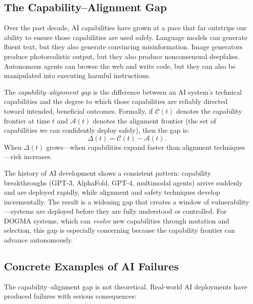 \subsection{The Capability--Alignment Gap}

Over the past decade, AI capabilities have grown at a pace that far outstrips our ability to ensure those capabilities are used safely.
Language models can generate fluent text, but they also generate convincing misinformation.
Image generators produce photorealistic output, but they also produce nonconsensual deepfakes.
Autonomous agents can browse the web and write code, but they can also be manipulated into executing harmful instructions.

\begin{dogmadef}
The \emph{capability--alignment gap} is the difference between an AI system's technical capabilities and the degree to which those capabilities are reliably directed toward intended, beneficial outcomes.
Formally, if $\mathcal{C}(t)$ denotes the capability frontier at time $t$ and $\mathcal{A}(t)$ denotes the alignment frontier (the set of capabilities we can confidently deploy safely), then the gap is:
\begin{equation}
\Delta(t) = \mathcal{C}(t) - \mathcal{A}(t).
\end{equation}
When $\Delta(t)$ grows---when capabilities expand faster than alignment techniques---risk increases.
\end{dogmadef}

\begin{keyinsight}
The history of AI development shows a consistent pattern: capability breakthroughs (GPT-3, AlphaFold, GPT-4, multimodal agents) arrive suddenly and are deployed rapidly, while alignment and safety techniques develop incrementally.
The result is a widening gap that creates a window of vulnerability---systems are deployed before they are fully understood or controlled.
For DOGMA systems, which can \emph{evolve} new capabilities through mutation and selection, this gap is especially concerning because the capability frontier can advance autonomously.
\end{keyinsight}

\subsection{Concrete Examples of AI Failures}

The capability--alignment gap is not theoretical.
Real-world AI deployments have produced failures with serious consequences:

